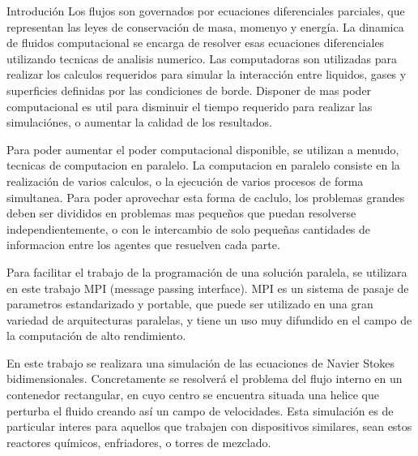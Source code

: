 \begin{section}{Introdución}
Los flujos son governados por ecuaciones diferenciales parciales, que representan las leyes de conservación de masa, momenyo y energía. La dinamica de fluidos computacional se encarga de resolver esas ecuaciones diferenciales utilizando tecnicas de analisis numerico. Las computadoras son utilizadas para realizar los calculos requeridos para simular la interacción entre liquidos, gases y superficies definidas por las condiciones de borde. Disponer de mas poder computacional es util para disminuir el tiempo requerido para realizar las simulaciónes, o aumentar la calidad de los resultados.

Para poder aumentar el poder computacional disponible, se utilizan a menudo, tecnicas de computacion en paralelo. La computacion en paralelo consiste en la realización de varios calculos, o la ejecución de varios procesos de forma simultanea. Para poder aprovechar esta forma de caclulo, los problemas grandes deben ser divididos en problemas mas pequeños que puedan resolverse independientemente, o con le intercambio de solo pequeñas cantidades de informacion entre los agentes que resuelven cada parte.

Para facilitar el trabajo de la programación de una solución paralela, se utilizara en este trabajo MPI (message passing interface). MPI es un sistema de pasaje de parametros estandarizado y portable, que puede ser utilizado en una gran variedad de arquitecturas paralelas, y tiene un uso muy difundido en el campo de la computación de alto rendimiento. 

En este trabajo se realizara una simulación de las ecuaciones de Navier Stokes bidimensionales. Concretamente se resolverá el problema del flujo interno en un contenedor rectangular, en cuyo centro se encuentra situada una helice que perturba el fluido creando así un campo de velocidades. Esta simulación es de particular interes para aquellos que trabajen con dispositivos similares, sean estos reactores químicos, enfriadores, o torres de mezclado. 

\end{section}


